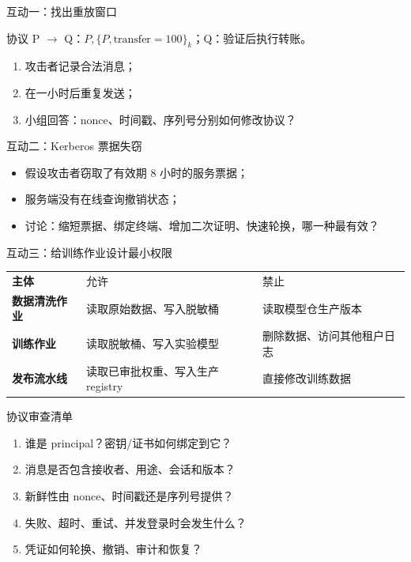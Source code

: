 \documentclass[UTF8,fontset=none,aspectratio=169,10pt]{beamer}
\begin{document}
\begin{frame}{互动一：找出重放窗口}
\begin{block}{协议}
P $\rightarrow$ Q：$P,\{P,\text{transfer}=100\}_{k}$；\quad Q：验证后执行转账。
\end{block}
\begin{enumerate}
  \item 攻击者记录合法消息；
  \item 在一小时后重复发送；
  \item 小组回答：nonce、时间戳、序列号分别如何修改协议？
\end{enumerate}
\vfill
{}
\end{frame}

\begin{frame}{互动二：Kerberos 票据失窃}
\begin{itemize}
  \item 假设攻击者窃取了有效期 8 小时的服务票据；
  \item 服务端没有在线查询撤销状态；
  \item 讨论：缩短票据、绑定终端、增加二次证明、快速轮换，哪一种最有效？
\end{itemize}
\vfill
{}
\end{frame}

\begin{frame}{互动三：给训练作业设计最小权限}
\begin{tabularx}{\linewidth}{>{\bfseries}p{3.1cm}XX}
\toprule
主体 & 允许 & 禁止 \\
数据清洗作业 & 读取原始数据、写入脱敏桶 & 读取模型仓生产版本 \\
训练作业 & 读取脱敏桶、写入实验模型 & 删除数据、访问其他租户日志 \\
发布流水线 & 读取已审批权重、写入生产 registry & 直接修改训练数据 \\
\bottomrule
\end{tabularx}
\vfill
{}
\end{frame}

\begin{frame}{协议审查清单}
\begin{enumerate}
  \item 谁是 principal？密钥/证书如何绑定到它？
  \item 消息是否包含接收者、用途、会话和版本？
  \item 新鲜性由 nonce、时间戳还是序列号提供？
  \item 失败、超时、重试、并发登录时会发生什么？
  \item 凭证如何轮换、撤销、审计和恢复？
\end{enumerate}
\end{frame}
\end{document}
